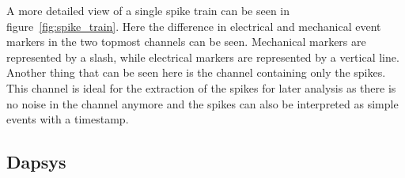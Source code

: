 A more detailed view of a single spike train can be seen in figure~\ref{fig:spike_train}. Here the difference in electrical and mechanical event markers in the two topmost channels can be seen. Mechanical markers are represented by a slash, while electrical markers are represented by a vertical line. Another thing that can be seen here is the channel containing only the spikes. This channel is ideal for the extraction of the spikes for later analysis as there is no noise in the channel anymore and the spikes can also be interpreted as simple events with a timestamp.

\subsection{Dapsys}

